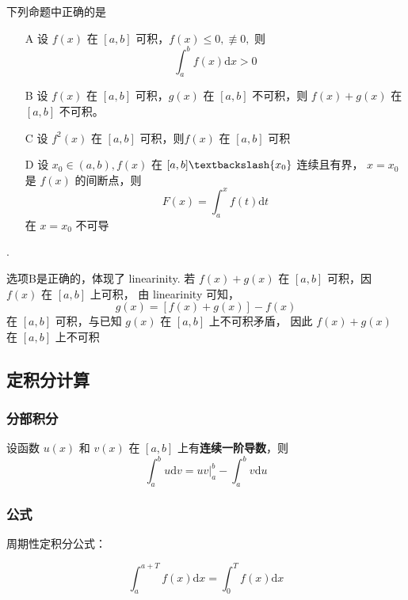 \begin{example}
    下列命题中正确的是
    \begin{itemize}
        \item[A] 设 $f(x)$ 在 $[a, b]$ 可积，$f(x) \leq 0, \nequiv 0, $ 则
            \[
                \int_a^b f(x) \mathrm dx > 0
            \]
        \item[B] 设 $f(x)$ 在 $[a, b]$ 可积，$g(x)$ 在 $[a, b]$ 不可积，则 $f(x) + g(x)$ 在 $[a, b]$ 不可积。
        \item[C] 设 $f^2(x)$ 在 $[a, b]$ 可积，则$f(x)$ 在 $[a, b]$ 可积
        \item[D] 设 $x_0 \in (a, b), f(x)$ 在 $[a, b]\textbackslash \{x_0\}$ 连续且有界，
            $x = x_0$ 是 $f(x)$ 的间断点，则
            \[
                F(x) = \int_a^x f(t) \mathrm dt
            \]
            在 $x = x_0$ 不可导
    \end{itemize}

    \cite[question 181]{w660}.

    选项B是正确的，体现了 linearinity.
    若 $f(x) + g(x)$ 在 $[a, b]$ 可积，因 $f(x)$ 在 $[a, b]$ 上可积，
    由 linearinity 可知，
    \[
        g(x) = [f(x) + g(x)] - f(x)
    \]
    在 $[a, b]$ 可积，与已知 $g(x)$ 在 $[a, b]$ 上不可积矛盾，
    因此 $f(x) + g(x)$ 在 $[a, b]$ 上不可积
\end{example}

\subsection{定积分计算}

\subsubsection{分部积分}

\begin{definition}[定积分分部积分法]
    设函数 $u(x)$ 和 $v(x)$ 在 $[a, b]$ 上有\textbf{连续一阶导数}，则
    \[
        \int_a^b u \mbox{d} v = uv \left.\right|^{b}_{a} - \int_a^b v \mbox{d} u
    \]
\end{definition}

\subsubsection{公式}

周期性定积分公式：
\begin{lemma}
    \begin{equation}
        \int_a^{a + T} f(x) \mathrm{d} x = \int_0^T f(x) \mathrm{d} x
    \end{equation}
\end{lemma}

